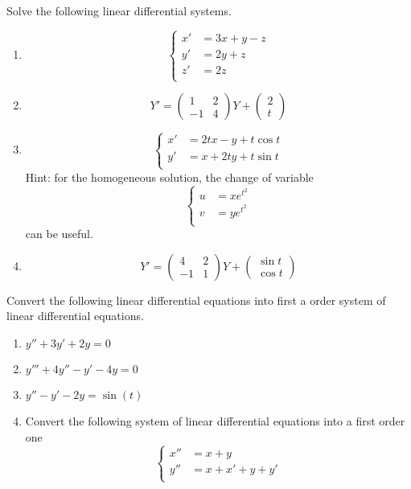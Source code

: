 \newpage
\begin{Pb}
Solve the following linear differential systems.
\begin{enumerate}
\item \[\left\{\begin{split}
x' & = 3x +y-z\\
y' & = 2y + z\\
z' & = 2z\\
\end{split}\right.\]
\item \[Y' = \begin{pmatrix} 1 & 2 \\ -1 & 4 \end{pmatrix} Y + \begin{pmatrix}2 \\ t\end{pmatrix}\]
\item \[\left\{\begin{split}
x' & = 2tx -y +t \cos t \\
y' & = x + 2ty + t \sin t\\
\end{split}\right.\]
Hint: for the homogeneous solution, the change of variable 
\[\left\{\begin{split}
u & = xe^{t^2} \\
v & = ye^{t^2} \\
\end{split}\right.\]
can be useful.
\item \[Y' = \begin{pmatrix} 4 & 2 \\ -1 & 1 \end{pmatrix} Y + \begin{pmatrix} \sin t \\ \cos t\end{pmatrix}\]
\end{enumerate} 
\end{Pb}

\begin{Pb}
Convert the following linear differential equations into first a order system of linear differential equations. 
\begin{enumerate}
\item $y'' + 3 y' +2y =0$
\item $y''' +4y'' -y' -4y =0 $
\item $y'' - y' -2y = \sin (t)$
\item Convert the following system of linear differential equations into a first order one
\[\left\{\begin{split}
x'' & = x+y \\
y'' & = x+ x' + y + y' \\
\end{split}\right.\]
\end{enumerate}
\end{Pb}

